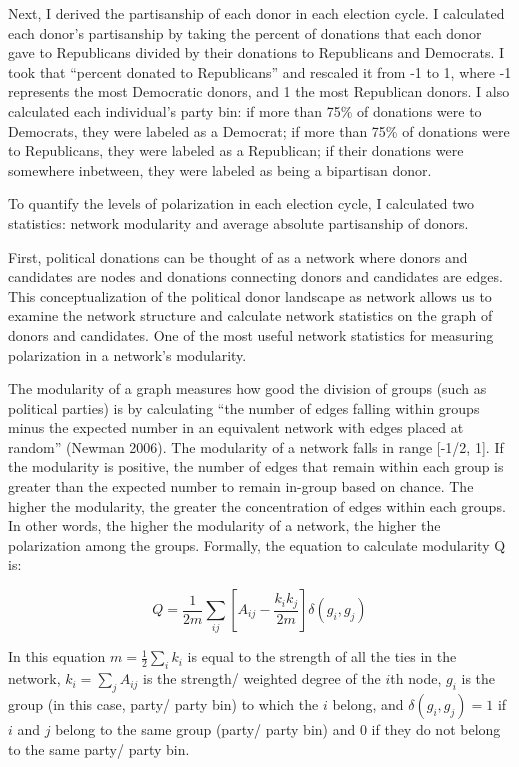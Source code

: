 \documentclass[12pt,]{article}
\begin{document}
Next, I derived the partisanship of each donor in each election cycle. I
calculated each donor's partisanship by taking the percent of donations
that each donor gave to Republicans divided by their donations to
Republicans and Democrats. I took that ``percent donated to
Republicans'' and rescaled it from -1 to 1, where -1 represents the most
Democratic donors, and 1 the most Republican donors. I also calculated
each individual's party bin: if more than 75\% of donations were to
Democrats, they were labeled as a Democrat; if more than 75\% of
donations were to Republicans, they were labeled as a Republican; if
their donations were somewhere inbetween, they were labeled as being a
bipartisan donor.

To quantify the levels of polarization in each election cycle, I
calculated two statistics: network modularity and average absolute
partisanship of donors.

First, political donations can be thought of as a network where donors
and candidates are nodes and donations connecting donors and candidates
are edges. This conceptualization of the political donor landscape as
network allows us to examine the network structure and calculate network
statistics on the graph of donors and candidates. One of the most useful
network statistics for measuring polarization in a network's modularity.

The modularity of a graph measures how good the division of groups (such
as political parties) is by calculating ``the number of edges falling
within groups minus the expected number in an equivalent network with
edges placed at random'' (Newman 2006). The modularity of a network
falls in range {[}-1/2, 1{]}. If the modularity is positive, the number
of edges that remain within each group is greater than the expected
number to remain in-group based on chance. The higher the modularity,
the greater the concentration of edges within each groups. In other
words, the higher the modularity of a network, the higher the
polarization among the groups. Formally, the equation to calculate
modularity Q is:

\[Q = \frac{1}{2m} \sum_{ij}\left[A_{ij} - \frac{k_{i}k_{j}}{2m} \right]\delta(g_{i},g_{j})\]

In this equation \(m = \frac{1}{2}\sum_{i}k_{i}\) is equal to the
strength of all the ties in the network, \(k_{i}=\sum_{j}A_{ij}\) is the
strength/ weighted degree of the \(i\)th node, \(g_{i}\) is the group
(in this case, party/ party bin) to which the \(i\) belong, and
\(\delta(g_{i},g_{j}) = 1\) if \(i\) and \(j\) belong to the same group
(party/ party bin) and 0 if they do not belong to the same party/ party
bin.
\end{document}
